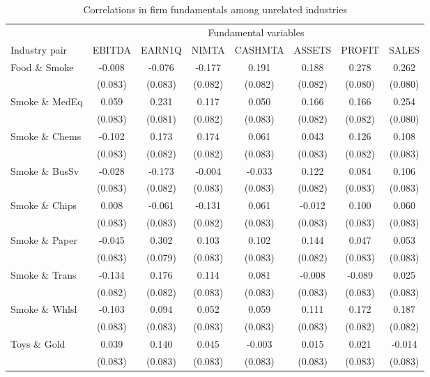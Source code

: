 \begin{table}

\caption{\label{tab:table-oa4}Correlations in firm fundamentals among unrelated industries}
\centering
\begin{tabular}[t]{lccccccc}
\toprule
\multicolumn{1}{c}{ } & \multicolumn{7}{c}{Fundamental variables} \\
\cmidrule(l{3pt}r{3pt}){2-8}
Industry pair & EBITDA & EARN1Q & NIMTA & CASHMTA & ASSETS & PROFIT & SALES\\
\midrule
Food \& Smoke & -0.008 & -0.076 & -0.177 & 0.191 & 0.188 & 0.278 & 0.262\\
 & (0.083) & (0.083) & (0.082) & (0.082) & (0.082) & (0.080) & (0.080)\\
Smoke \& MedEq & 0.059 & 0.231 & 0.117 & 0.050 & 0.166 & 0.166 & 0.254\\
 & (0.083) & (0.081) & (0.082) & (0.083) & (0.082) & (0.082) & (0.080)\\
Smoke \& Chems & -0.102 & 0.173 & 0.174 & 0.061 & 0.043 & 0.126 & 0.108\\
\addlinespace
 & (0.083) & (0.082) & (0.082) & (0.083) & (0.083) & (0.082) & (0.083)\\
Smoke \& BusSv & -0.028 & -0.173 & -0.004 & -0.033 & 0.122 & 0.084 & 0.106\\
 & (0.083) & (0.082) & (0.083) & (0.083) & (0.082) & (0.083) & (0.083)\\
Smoke \& Chips & 0.008 & -0.061 & -0.131 & 0.061 & -0.012 & 0.100 & 0.060\\
 & (0.083) & (0.083) & (0.082) & (0.083) & (0.083) & (0.083) & (0.083)\\
\addlinespace
Smoke \& Paper & -0.045 & 0.302 & 0.103 & 0.102 & 0.144 & 0.047 & 0.053\\
 & (0.083) & (0.079) & (0.083) & (0.083) & (0.082) & (0.083) & (0.083)\\
Smoke \& Trans & -0.134 & 0.176 & 0.114 & 0.081 & -0.008 & -0.089 & 0.025\\
 & (0.082) & (0.082) & (0.083) & (0.083) & (0.083) & (0.083) & (0.083)\\
Smoke \& Whlsl & -0.103 & 0.094 & 0.052 & 0.059 & 0.111 & 0.172 & 0.187\\
\addlinespace
 & (0.083) & (0.083) & (0.083) & (0.083) & (0.083) & (0.082) & (0.082)\\
Toys \& Gold & 0.039 & 0.140 & 0.045 & -0.003 & 0.015 & 0.021 & -0.014\\
 & (0.083) & (0.083) & (0.083) & (0.083) & (0.083) & (0.083) & (0.083)\\

\end{tabular}
\end{table}
